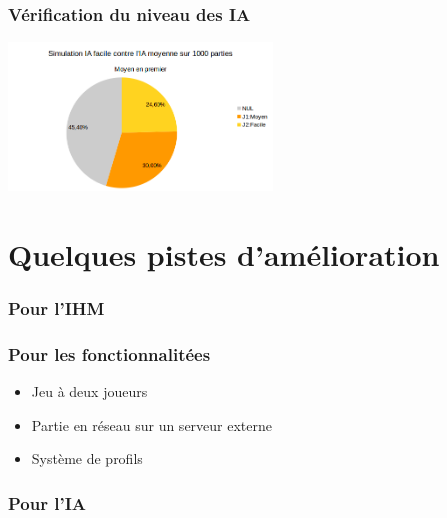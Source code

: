 \documentclass{beamer}
\begin{document}
\begin{frame}
\frametitle{V\'erification du niveau des IA}
\begin{center}
\includegraphics[width=7cm]{./TresFacTresFac.png}
\end{center}
\end{frame}
\section{Quelques pistes d'am\'elioration}%

\begin{frame}
\frametitle{Pour l'IHM}
\end{frame}
\begin{frame}
\frametitle{Pour les fonctionnalit\'ees}
\begin{itemize}
\item Jeu \`a deux joueurs
\item Partie en r\'eseau sur un serveur externe
\item Syst\`eme de profils
\end{itemize}
\end{frame}

\begin{frame}
\frametitle{Pour l'IA}
\end{frame}
\end{document}
